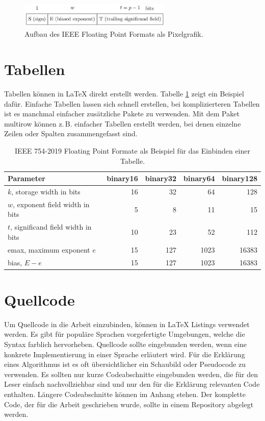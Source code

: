 \begin{figure}[ht]
\centering
\includegraphics[width=0.65\textwidth]{figures/ieee_float_format.jpg}
\caption{Aufbau des IEEE Floating Point Formats als Pixelgrafik.}
\label{fig:ieee_float_format_pixel}
\end{figure}

\section{Tabellen}
Tabellen können in \LaTeX{} direkt erstellt werden. Tabelle \ref{tab:ieee_formats} zeigt ein Beispiel dafür. Einfache Tabellen lassen sich schnell erstellen, bei komplizierteren Tabellen ist es manchmal einfacher zusätzliche Pakete zu verwenden. Mit dem Paket multirow \cite{multirow} können z.\,B. einfacher Tabellen erstellt werden, bei denen einzelne Zeilen oder Spalten zusammengefasst sind.

\begin{table}[ht]
\centering
\begin{tabular}{|l|r|r|r|r|} 
 \hline
 Parameter & binary16 & binary32 & binary64 & binary128 \\
 \hline
  $k$, storage width in bits           & 16 &  32 &   64 &   128 \\ 
  $w$, exponent field width in bits    &  5 &   8 &   11 &    15 \\
  $t$, significand field width in bits & 10 &  23 &   52 &   112 \\
  emax, maximum exponent $e$           & 15 & 127 & 1023 & 16383 \\
  bias, $E-e$                          & 15 & 127 & 1023 & 16383 \\
 \hline
\end{tabular}
\caption{IEEE 754-2019 Floating Point Formate als Beispiel für das Einbinden einer Tabelle.}
\label{tab:ieee_formats}
\end{table}

\section{Quellcode}
Um Quellcode in die Arbeit einzubinden, können in \LaTeX{} Listings verwendet werden. Es gibt für populäre Sprachen vorgefertigte Umgebungen, welche die Syntax farblich hervorheben. Quellcode sollte eingebunden werden, wenn eine konkrete Implementierung in einer Sprache erläutert wird. Für die Erklärung eines Algorithmus ist es oft übersichtlicher ein Schaubild oder Pseudocode zu verwenden. Es sollten nur kurze Codeabschnitte eingebunden werden, die für den Leser einfach nachvollziehbar sind und nur den für die Erklärung relevanten Code enthalten. Längere Codeabschnitte können im Anhang stehen. Der komplette Code, der für die Arbeit geschrieben wurde, sollte in einem Repository abgelegt werden.

